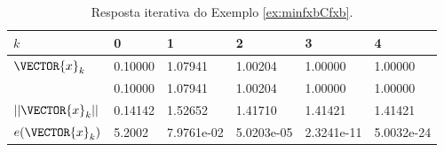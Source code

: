 \begin{table}[h!]
\centering
\begin{tabular}{|l|l|l|l|l|l|}
\hline
$k$ & 0 & 1 & 2 & 3 & 4 \\ \hline
$\VECTOR{x}_k$ & 0.10000   & 1.07941   & 1.00204   & 1.00000   & 1.00000 \\ 
~              & 0.10000   & 1.07941   & 1.00204   & 1.00000   & 1.00000 \\ \hline
$||\VECTOR{x}_k||$ & 0.14142   & 1.52652   & 1.41710   & 1.41421   & 1.41421 \\ \hline
$e(\VECTOR{x}_k)$ & 5.2002 &   7.9761e-02  & 5.0203e-05  & 2.3241e-11  & 5.0032e-24 \\ \hline
\end{tabular}
\caption{Resposta iterativa do Exemplo \ref{ex:minfxbCfxb}.}
\label{table:ex:minfxbCfxb}
\end{table}
